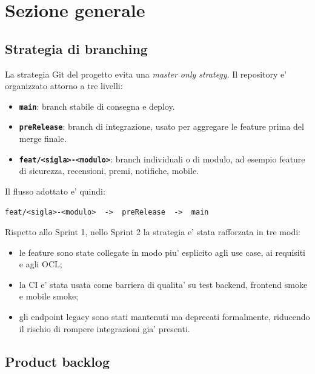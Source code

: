 \documentclass[11pt,a4paper]{article}
\newcommand{\code}[1]{\texttt{#1}}
\begin{document}
\section{Sezione generale}

\subsection{Strategia di branching}

La strategia Git del progetto evita una \emph{master only strategy}. Il repository
e' organizzato attorno a tre livelli:

\begin{itemize}
  \item \textbf{\code{main}}: branch stabile di consegna e deploy.
  \item \textbf{\code{preRelease}}: branch di integrazione, usato per aggregare le feature prima del merge finale.
  \item \textbf{\code{feat/<sigla>-<modulo>}}: branch individuali o di modulo, ad esempio feature di sicurezza, recensioni, premi, notifiche, mobile.
\end{itemize}

Il flusso adottato e' quindi:

\begin{lstlisting}[style=plaincode]
feat/<sigla>-<modulo>  ->  preRelease  ->  main
\end{lstlisting}

Rispetto allo Sprint 1, nello Sprint 2 la strategia e' stata rafforzata in tre modi:

\begin{itemize}
  \item le feature sono state collegate in modo piu' esplicito agli use case, ai requisiti e agli OCL;
  \item la CI e' stata usata come barriera di qualita' su test backend, frontend smoke e mobile smoke;
  \item gli endpoint legacy sono stati mantenuti ma deprecati formalmente, riducendo il rischio di rompere integrazioni gia' presenti.
\end{itemize}

\subsection{Product backlog}
\end{document}
